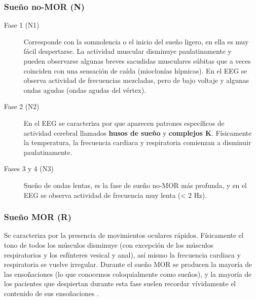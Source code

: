 
\subsubsection{Sueño no-MOR (N)}

\begin{description}
\item[Fase 1 (N1)] Corresponde con la somnolencia o el inicio del sue\~no ligero, en ella es muy 
f\'acil despertarse. La actividad muscular disminuye paulatinamente y pueden observarse algunas 
breves sacudidas musculares s\'ubitas que a veces coinciden con una sensación de ca\'ida 
(mioclon\'ias h\'ipnicas). En el EEG se observa actividad de frecuencias mezcladas, pero de bajo 
voltaje y algunas ondas agudas (ondas agudas del v\'ertex). 

\item[Fase 2 (N2)] En el EEG se caracteriza por que aparecen patrones espec\'ificos de actividad 
cerebral llamados \textbf{husos de sue\~no} y \textbf{complejos K}. F\'isicamente la 
temperatura, la frecuencia cardiaca y respiratoria comienzan a disminuir paulatinamente. 

\item[Fases 3 y 4 (N3)] Sue\~no de ondas lentas, es la fase de sue\~no no-MOR m\'as profunda, 
y en el EEG se observa actividad de frecuencia muy lenta (< 2 Hz).
\end{description}


\subsubsection{Sueño MOR (R)}

Se caracteriza por la presencia de movimientos oculares r\'apidos. F\'isicamente el tono de todos 
los m\'usculos disminuye (con excepción de los m\'usculos respiratorios y los esf\'interes vesical 
y anal), as\'i mismo la frecuencia cardiaca y respiratoria se vuelve irregular.%
Durante el sue\~no MOR se producen la mayor\'ia de las enso\~naciones (lo que conocemos 
coloquialmente como sue\~nos), y la mayor\'ia de los pacientes que despiertan durante esta fase 
suelen recordar v\'ividamente el contenido de sus enso\~naciones \cite{Chokroverty09}.

